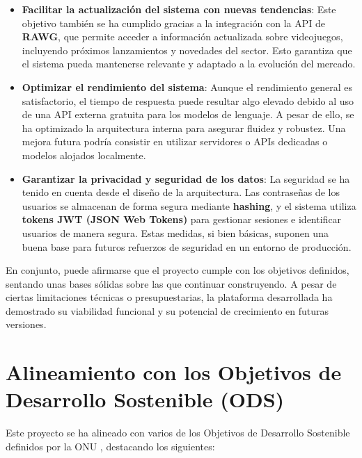 \begin{itemize}
	\item \textbf{Facilitar la actualización del sistema con nuevas tendencias}:
	Este objetivo también se ha cumplido gracias a la integración con la API de \textbf{RAWG}, que permite acceder a información actualizada sobre videojuegos, incluyendo próximos lanzamientos y novedades del sector. Esto garantiza que el sistema pueda mantenerse relevante y adaptado a la evolución del mercado.
	
	\item \textbf{Optimizar el rendimiento del sistema}:
	Aunque el rendimiento general es satisfactorio, el tiempo de respuesta puede resultar algo elevado debido al uso de una API externa gratuita para los modelos de lenguaje. A pesar de ello, se ha optimizado la arquitectura interna para asegurar fluidez y robustez. Una mejora futura podría consistir en utilizar servidores o APIs dedicadas o modelos alojados localmente.
	
	\item \textbf{Garantizar la privacidad y seguridad de los datos}:
	La seguridad se ha tenido en cuenta desde el diseño de la arquitectura. Las contraseñas de los usuarios se almacenan de forma segura mediante \textbf{hashing}, y el sistema utiliza \textbf{tokens JWT (JSON Web Tokens)} para gestionar sesiones e identificar usuarios de manera segura. Estas medidas, si bien básicas, suponen una buena base para futuros refuerzos de seguridad en un entorno de producción.
	
\end{itemize}

En conjunto, puede afirmarse que el proyecto cumple con los objetivos definidos, sentando unas bases sólidas sobre las que continuar construyendo. A pesar de ciertas limitaciones técnicas o presupuestarias, la plataforma desarrollada ha demostrado su viabilidad funcional y su potencial de crecimiento en futuras versiones.


\newpage

\section{Alineamiento con los Objetivos de Desarrollo Sostenible (ODS)}

Este proyecto se ha alineado con varios de los Objetivos de Desarrollo Sostenible definidos por la ONU \cite{ONU_ODS_Web}, destacando los siguientes:

